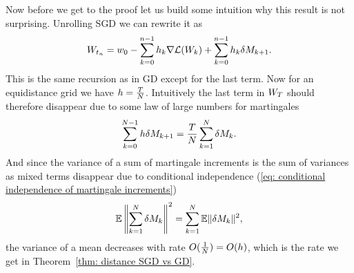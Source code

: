 Now before we get to the proof let us build some intuition why this result
is not surprising. Unrolling SGD we can rewrite it as
\begin{align}\label{eq: unrolled SGD}
	W_{t_n}
	= w_0 - \sum_{k=0}^{n-1} h_k \nabla\mathcal{L}(W_k)
	+ \sum_{k=0}^{n-1} h_k\delta M_{k+1}.
\end{align}
This is the same recursion as in GD except for the last term. Now for an
equidistance grid we have \(h=\frac{T}{N}\). Intuitively the last term in \(W_T\)
should therefore disappear due to some law of large numbers for martingales
\begin{align}\label{eq: mean of martingale increments}
	\sum_{k=0}^{N-1}h\delta M_{k+1} = \frac{T}{N}\sum_{k=1}^N\delta M_k.
\end{align}
And since the variance of a sum of martingale increments is the sum of variances
as mixed terms disappear due to conditional independence (\ref{eq: conditional
independence of martingale increments})
\begin{align*}
	\mathbb{E}\left\|\sum_{k=1}^N\delta M_k\right\|^2 = \sum_{k=1}^N \mathbb{E}\|\delta M_k\|^2,
\end{align*}
the variance of a mean decreases with rate \(O(\frac{1}{N})=O(h)\), which is the rate
we get in Theorem~\ref{thm: distance SGD vs GD}.
